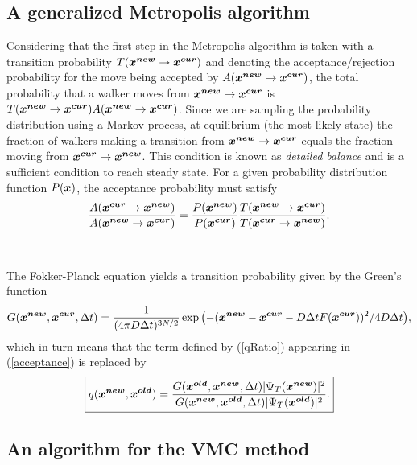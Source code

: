 \subsection{A generalized Metropolis algorithm}
Considering that the first step in the Metropolis algorithm is taken with a transition probability $T(\boldsymbol{x^{new}}\rightarrow \boldsymbol{x^{cur}})$ and denoting the acceptance/rejection probability for the move being accepted by $A(\boldsymbol{x^{new}}\rightarrow \boldsymbol{x^{cur}})$, the total probability that a walker moves from $\boldsymbol{x^{new}}\rightarrow \boldsymbol{x^{cur}}$ is $T(\boldsymbol{x^{new}}\rightarrow \boldsymbol{x^{cur}})A(\boldsymbol{x^{new}}\rightarrow \boldsymbol{x^{cur}})$. Since we are sampling the probability distribution using a Markov process, at equilibrium (the most likely state) the fraction of walkers making a transition from $\boldsymbol{x^{new}}\rightarrow \boldsymbol{x^{cur}}$ equals the fraction moving from  $\boldsymbol{x^{cur}}\rightarrow \boldsymbol{x^{new}}$. This condition is known as \emph{detailed balance} and is a sufficient condition to reach steady state.  For a given probability distribution function $P(\boldsymbol{x})$, 
% 
the acceptance probability must satisfy
$$\frac{A(\boldsymbol{x^{cur}}\rightarrow \boldsymbol{x^{new}})}{A(\boldsymbol{x^{new}}\rightarrow \boldsymbol{x^{cur}})} = \frac{P(\boldsymbol{x^{new}})}{P(\boldsymbol{x^{cur}})} \frac{T(\boldsymbol{x^{new}}\rightarrow \boldsymbol{x^{cur}})}{T(\boldsymbol{x^{cur}}\rightarrow \boldsymbol{x^{new}})}.$$\\
\\
\noindent
The Fokker-Planck equation yields a transition probability given by the Green's function
\begin{equation}\label{greensFunction}
G(\boldsymbol{x^{new}},\boldsymbol{x^{cur}},\Delta t) = \frac{1}{(4\pi D\Delta t)^{3N/2}} \exp{\left(-(\boldsymbol{x^{new}}-\boldsymbol{x^{cur}}-D\Delta t F(\boldsymbol{x^{cur}}))^2/4D\Delta t\right)},
\end{equation}
which in turn means that the term defined by (\ref{qRatio}) appearing in (\ref{acceptance}) is replaced by 
\begin{equation}\label{importanceSamplingRatio}
\boxed{q(\boldsymbol{x^{new}},\boldsymbol{x^{old}}) = \frac{G(\boldsymbol{x^{old}},\boldsymbol{x^{new}},\Delta t)|\Psi_T(\boldsymbol{x^{new}})|^2}{G(\boldsymbol{x^{new}},\boldsymbol{x^{old}},\Delta t)|\Psi_T(\boldsymbol{x^{old}})|^2}.}
\end{equation}



\subsection{An algorithm for the VMC method}

